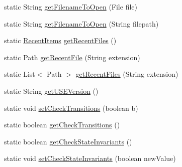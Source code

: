 \begin{DoxyCompactItemize}
\item 
static String \hyperlink{classorg_1_1tzi_1_1use_1_1config_1_1_options_aef57eec24f5f35409e9f4fac1161aaf7}{get\-Filename\-To\-Open} (File file)
\item 
static String \hyperlink{classorg_1_1tzi_1_1use_1_1config_1_1_options_a212aa0c37956bb26d8ab7bfdf0d9de6c}{get\-Filename\-To\-Open} (String filepath)
\item 
static \hyperlink{classorg_1_1tzi_1_1use_1_1config_1_1_recent_items}{Recent\-Items} \hyperlink{classorg_1_1tzi_1_1use_1_1config_1_1_options_ad04af449ea9bfdb557069be63005f9be}{get\-Recent\-Files} ()
\item 
static Path \hyperlink{classorg_1_1tzi_1_1use_1_1config_1_1_options_a0b92d589f88c8de42c8559d00f819ff2}{get\-Recent\-File} (String extension)
\item 
static List$<$ Path $>$ \hyperlink{classorg_1_1tzi_1_1use_1_1config_1_1_options_aaa614e01bd7c1923010f39342a91ae28}{get\-Recent\-Files} (String extension)
\item 
static String \hyperlink{classorg_1_1tzi_1_1use_1_1config_1_1_options_a4076e6ea0da84b30644d95463e374396}{get\-U\-S\-E\-Version} ()
\item 
static void \hyperlink{classorg_1_1tzi_1_1use_1_1config_1_1_options_a42abd581d7e50badf18332021748e61c}{set\-Check\-Transitions} (boolean b)
\item 
static boolean \hyperlink{classorg_1_1tzi_1_1use_1_1config_1_1_options_a344fb43c65f94dde18237e323ed7f0bd}{get\-Check\-Transitions} ()
\item 
static boolean \hyperlink{classorg_1_1tzi_1_1use_1_1config_1_1_options_a296cf72f74cb1ed0064de1eb79e26a63}{get\-Check\-State\-Invariants} ()
\item 
static void \hyperlink{classorg_1_1tzi_1_1use_1_1config_1_1_options_a651611f7d9f8a6e17ddc2d50d976d977}{set\-Check\-State\-Invariants} (boolean new\-Value)
\end{DoxyCompactItemize}
